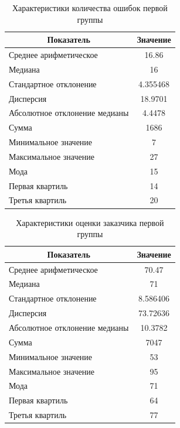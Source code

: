 \begin{table}[H]
	\centering
	\caption{Характеристики количества ошибок первой группы}
	\begin{tabular}{|l|c|}
		\hline
		\multicolumn{1}{|c|}{\textbf{Показатель}} & \textbf{Значение}\\ \hline
		Среднее арифметическое        & 16.86    \\ \hline
		Медиана                       & 16       \\ \hline
		Стандартное отклонение        & 4.355468 \\ \hline
		Дисперсия                      & 18.9701  \\ \hline
		Абсолютное отклонение медианы & 4.4478   \\ \hline
		Сумма                         & 1686     \\ \hline
		Минимальное значение          & 7        \\ \hline
		Максимальное значение         & 27       \\ \hline
		Мода & 15 \\ \hline
		Первая квартиль & 14 \\ \hline
		Третья квартиль & 20 \\ \hline
	\end{tabular}
\end{table}


\begin{table}[H]
	\centering
	\caption{Характеристики оценки заказчика первой группы}
	\begin{tabular}{|l|c|}
		\hline
		\multicolumn{1}{|c|}{\textbf{Показатель}} & \textbf{Значение}\\ \hline
		Среднее арифметическое        & 70.47    \\ \hline
		Медиана                       & 71       \\ \hline
		Стандартное отклонение        & 8.586406 \\ \hline
		Дисперсия                      & 73.72636 \\ \hline
		Абсолютное отклонение медианы & 10.3782  \\ \hline
		Сумма                         & 7047     \\ \hline
		Минимальное значение          & 53       \\ \hline
		Максимальное значение         & 95       \\ \hline
		Мода & 71 \\ \hline
		Первая квартиль & 64 \\ \hline
		Третья квартиль & 77 \\ \hline
	\end{tabular}
\end{table}


